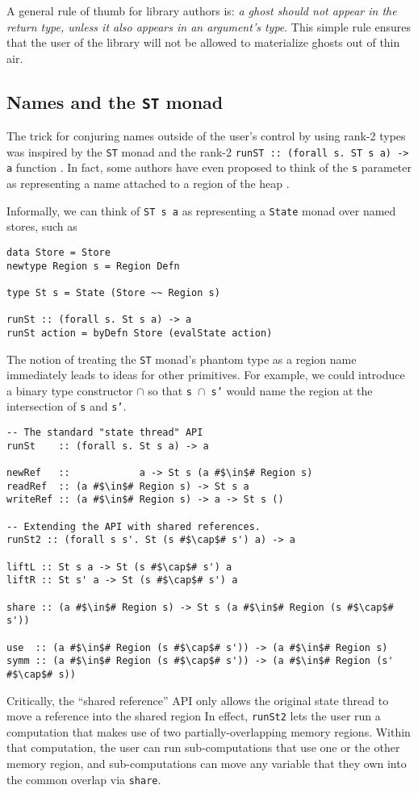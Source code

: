 \documentclass[format=sigplan, review=false, screen=true]{acmart}
\begin{document}
A general rule of thumb for library authors is:
\emph{a ghost should not appear in the return type,  unless it also appears in an argument's type}. This simple rule ensures that
the user of the library will not be allowed to materialize ghosts out of thin air.

\subsection{Names and the \texttt{ST} monad}
The trick for conjuring names outside of the user's control by using rank-2 types was
inspired by the \texttt{ST} monad and the rank-2 \texttt{runST :: (forall s. ST s a) -> a}
function \cite{launchbury1994lazy}. In fact, some authors have even proposed to think of the \texttt{s} parameter as
representing a name attached to a region of the heap \citep{timany2017logical}.

Informally, we can think of \texttt{ST s a} as representing a \texttt{State} monad over
named stores, such as
\begin{verbatim}
data Store = Store
newtype Region s = Region Defn

type St s = State (Store ~~ Region s)

runSt :: (forall s. St s a) -> a
runSt action = byDefn Store (evalState action)
\end{verbatim}

The notion of treating the \texttt{ST} monad's phantom type as a region name immediately leads to ideas for
other primitives. For example, we could introduce a binary type constructor $\cap$ so that \texttt{s $\cap$ s'}
would name the region at the intersection of \texttt{s} and \texttt{s'}. 

\begin{verbatim}
-- The standard "state thread" API
runSt    :: (forall s. St s a) -> a

newRef   ::            a -> St s (a #$\in$# Region s)
readRef  :: (a #$\in$# Region s) -> St s a
writeRef :: (a #$\in$# Region s) -> a -> St s ()

-- Extending the API with shared references.
runSt2 :: (forall s s'. St (s #$\cap$# s') a) -> a

liftL :: St s a -> St (s #$\cap$# s') a
liftR :: St s' a -> St (s #$\cap$# s') a

share :: (a #$\in$# Region s) -> St s (a #$\in$# Region (s #$\cap$# s'))

use  :: (a #$\in$# Region (s #$\cap$# s')) -> (a #$\in$# Region s)
symm :: (a #$\in$# Region (s #$\cap$# s')) -> (a #$\in$# Region (s' #$\cap$# s))
\end{verbatim}
Critically, the ``shared reference'' API only allows the
original state thread to move a reference into the shared region
In effect, \texttt{runSt2} lets the user run a computation that makes use of
two partially-overlapping memory regions. Within that computation, the user
can run sub-computations that use one or the other memory region, and
sub-computations can move any variable that they own into the common overlap
via \texttt{share}.
\end{document}
